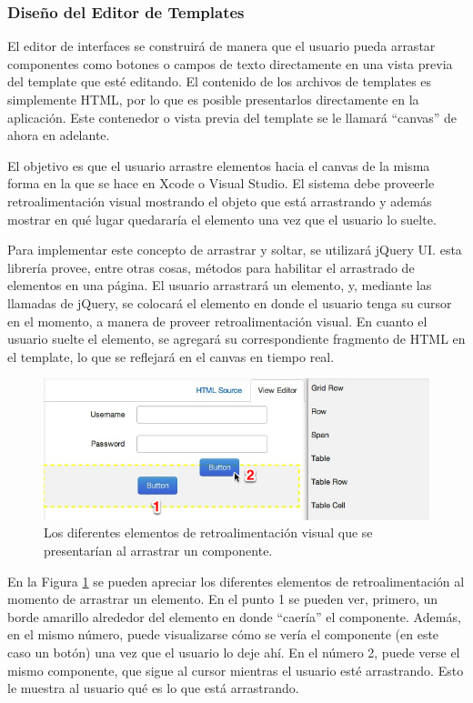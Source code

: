 \documentclass[12pt,spanish,letter]{report}
\makeatletter
\def\maxwidth{\ifdim\Gin@nat@width>\linewidth\linewidth
\else\Gin@nat@width\fi}
\let\Oldincludegraphics\includegraphics
\renewcommand{\includegraphics}[1]{\Oldincludegraphics[width=\maxwidth]{#1}}
\makeatother
\begin{document}
\subsubsection{Diseño del Editor de Templates}

El editor de interfaces se construirá de manera que el usuario pueda
arrastar componentes como botones o campos de texto directamente en una
vista previa del template que esté editando. El contenido de los
archivos de templates es simplemente HTML, por lo que es posible
presentarlos directamente en la aplicación. Este contenedor o vista
previa del template se le llamará ``canvas'' de ahora en adelante.

El objetivo es que el usuario arrastre elementos hacia el canvas de la
misma forma en la que se hace en Xcode o Visual Studio. El sistema debe
proveerle retroalimentación visual mostrando el objeto que está
arrastrando y además mostrar en qué lugar quedararía el elemento una vez
que el usuario lo suelte.

Para implementar este concepto de arrastrar y soltar, se utilizará
jQuery UI. esta librería provee, entre otras cosas, métodos para
habilitar el arrastrado de elementos en una página. El usuario
arrastrará un elemento, y, mediante las llamadas de jQuery, se colocará
el elemento en donde el usuario tenga su cursor en el momento, a manera
de proveer retroalimentación visual. En cuanto el usuario suelte el
elemento, se agregará su correspondiente fragmento de HTML en el
template, lo que se reflejará en el canvas en tiempo real.

\begin{figure}[htbp]
\centering
\includegraphics{figures/drag-editor.png}
\caption{Los diferentes elementos de retroalimentación visual que se
presentarían al arrastrar un componente. \label{figures:drag-editor}}
\end{figure}

En la Figura \ref{figures:drag-editor} se pueden apreciar los diferentes
elementos de retroalimentación al momento de arrastrar un elemento. En
el punto 1 se pueden ver, primero, un borde amarillo alrededor del
elemento en donde ``caería'' el componente. Además, en el mismo número,
puede visualizarse cómo se vería el componente (en este caso un botón)
una vez que el usuario lo deje ahí. En el número 2, puede verse el mismo
componente, que sigue al cursor mientras el usuario esté arrastrando.
Esto le muestra al usuario qué es lo que está arrastrando.
\end{document}

